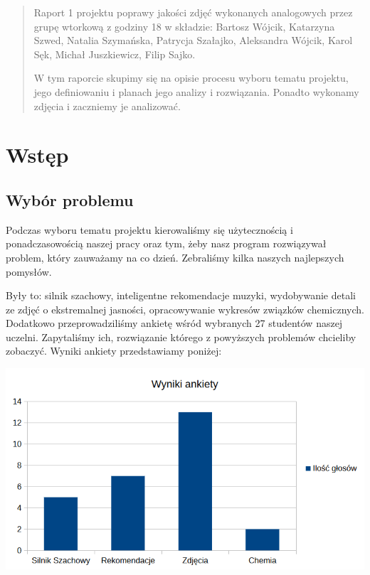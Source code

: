 \documentclass[options]{mwart}
\begin{document}
\vfill
\begin{abstract}
    Raport 1 projektu poprawy jakości zdjęć wykonanych analogowych przez grupę wtorkową z godziny 18
    w składzie:  Bartosz Wójcik, Katarzyna Szwed, Natalia Szymańska,
    Patrycja Szałajko, Aleksandra Wójcik, Karol Sęk, Michał Juszkiewicz, Filip Sajko.

    W tym raporcie skupimy się na opisie procesu wyboru tematu projektu, jego definiowaniu
    i planach jego analizy i rozwiązania. Ponadto wykonamy zdjęcia i zaczniemy je analizować.
\end{abstract}

\newpage
\tableofcontents{}

\newpage



\section{Wstęp}
\subsection{Wybór problemu}
Podczas wyboru tematu projektu kierowaliśmy się użytecznością
i ponadczasowością naszej pracy oraz tym, żeby nasz program
rozwiązywał problem,  który zauważamy na co dzień. Zebraliśmy
kilka naszych najlepszych pomysłów.

Były to: silnik szachowy, inteligentne
rekomendacje muzyki, wydobywanie detali ze zdjęć o ekstremalnej
jasności, opracowywanie wykresów związków chemicznych.
Dodatkowo przeprowadziliśmy ankietę wśród wybranych 27
studentów naszej uczelni. Zapytaliśmy ich, rozwiązanie
którego z powyższych problemów chcieliby zobaczyć.
Wyniki ankiety przedstawiamy poniżej:

\includegraphics[width=1\textwidth]{wyniki_ankiety.png}
\end{document}
